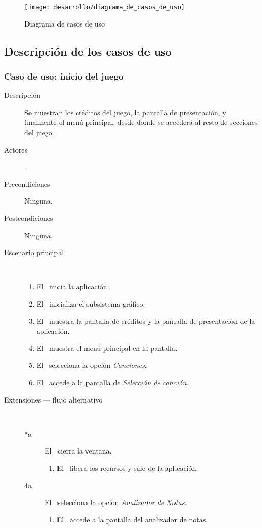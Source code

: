 \begin{figure}[h!]
  \centering
  \texttt{[image: desarrollo/diagrama\_de\_casos\_de\_uso]}
  \caption{Diagrama de casos de uso}
\end{figure}


\subsection{Descripción de los casos de uso}

\subsubsection{Caso de uso: inicio del juego}
\begin{description}
\item [Descripción] Se muestran los créditos del juego, la pantalla de
  presentación, y finalmente el menú principal, desde donde se accederá al
  resto de secciones del juego.
\item [Actores] \jugador.
\item [Precondiciones] Ninguna.
\item [Postcondiciones] Ninguna.
\item [Escenario principal] $\quad$
  \begin{enumerate}
  \item El \jugador\ inicia la aplicación.
  \item El \sistema\ inicializa el subsistema gráfico.
  \item El \sistema\ muestra la pantalla de créditos y la pantalla de
    presentación de la aplicación.
  \item El \sistema\ muestra el menú principal en la pantalla.
  \item El \jugador\ selecciona la opción \textit{Canciones}.
  \item El \sistema\ accede a la pantalla de \textit{Selección de canción}.
  \end{enumerate}
\item[Extensiones --- flujo alternativo] $\quad$
  \begin{description}
  \item [*a] El \jugador\ cierra la ventana.
    \begin{enumerate}
    \item El \sistema\ libera los recursos y sale de la aplicación.
    \end{enumerate}
  \item [4a] El \jugador\ selecciona la opción \textit{Analizador de Notas}.
    \begin{enumerate}
    \item El \sistema\ accede a la pantalla del analizador de notas.
    \end{enumerate}


\end{description}
\end{description}
